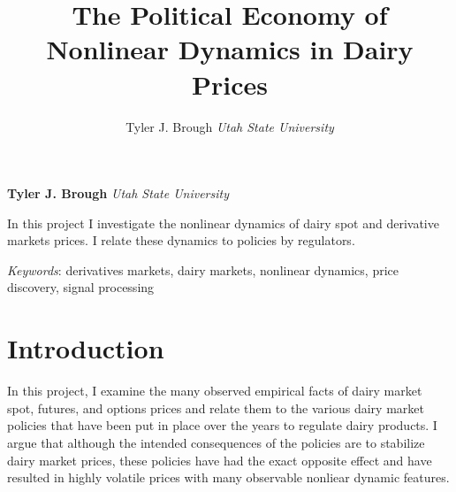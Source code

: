 \documentclass[11pt,]{article}
\title{The Political Economy of Nonlinear Dynamics in Dairy Prices  }
\author{\Large Tyler J. Brough\vspace{0.05in} \newline\normalsize\emph{Utah State University}  }
\date{}
\newcommand*{\authorfont}{\fontfamily{phv}\selectfont}
\renewenvironment{abstract}
 {{%
    \setlength{\leftmargin}{0mm}
    \setlength{\rightmargin}{\leftmargin}%
  }%
  \relax}
 {\endlist}
\begin{document}
	
%

{%
\setlength{\parindent}{0pt}
\thispagestyle{plain}
{\fontsize{18}{20}\selectfont\raggedright 
\maketitle  %

}

{
   \vskip 13.5pt\relax \normalsize\fontsize{11}{12} 
\textbf{\authorfont Tyler J. Brough} \hskip 15pt \emph{\small Utah State University}   

}

}







\begin{abstract}

    \hbox{\vrule height .2pt width 39.14pc}

    \vskip 8.5pt %

\noindent In this project I investigate the nonlinear dynamics of dairy spot and
derivative markets prices. I relate these dynamics to policies by
regulators.


\vskip 8.5pt \noindent \emph{Keywords}: derivatives markets, dairy markets, nonlinear dynamics, price discovery,
signal processing \par

    \hbox{\vrule height .2pt width 39.14pc}



\end{abstract}


\vskip 6.5pt

\noindent \doublespacing \section{Introduction}\label{introduction}

In this project, I examine the many observed empirical facts of dairy
market spot, futures, and options prices and relate them to the various
dairy market policies that have been put in place over the years to
regulate dairy products. I argue that although the intended consequences
of the policies are to stabilize dairy market prices, these policies
have had the exact opposite effect and have resulted in highly volatile
prices with many observable nonliear dynamic features.
\end{document}
